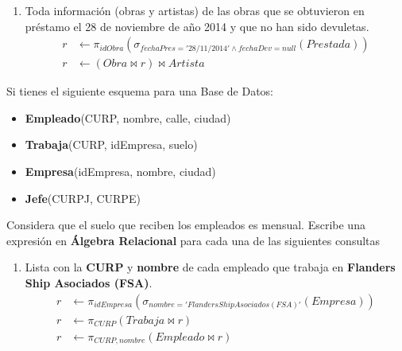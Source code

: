 \documentclass{article}
\begin{document}
\begin{enumerate}
{\begin{enumerate}
{\begin{align*}
                        maxP &\leftarrow \pi_{idObra}(maxP) \bowtie Obra
                    \end{align*}
                }
                \item {
                    Toda información (obras y artistas) de las obras que se
                    obtuvieron en préstamo el 28 de noviembre de año 2014 y que
                    no han sido devuletas.
                    \begin{align*}
                        r &\leftarrow \pi_{idObra}(\sigma_{fechaPres = '28/11/2014' \land
                        fechaDev=null}(Prestada))\\
                        r &\leftarrow (Obra \bowtie r)\bowtie Artista
                    \end{align*}
                }
            \end{enumerate}
            \item {
                Si tienes el siguiente esquema para una Base de Datos:
                \begin{itemize}[label={}]
                    \item \textbf{Empleado}(CURP, nombre, calle, ciudad)
                    \item \textbf{Trabaja}(CURP, idEmpresa, suelo)
                    \item \textbf{Empresa}(idEmpresa, nombre, ciudad)
                    \item \textbf{Jefe}(CURPJ, CURPE)
                \end{itemize}
                Considera que el suelo que reciben los empleados es mensual.
                Escribe una expresión en \textbf{Álgebra Relacional} para cada
                una de las siguientes consultas
                \begin{enumerate}
                    \item {
                        Lista con la \textbf{CURP} y \textbf{nombre} de cada
                        empleado que trabaja en \textbf{Flanders Ship Asociados
                        (FSA)}.
                        \begin{align*}
                            r &\leftarrow \pi_{idEmpresa}(\sigma_{nombre = 
                            'Flanders Ship Asociados(FSA)'}(Empresa)) \\
                            r &\leftarrow \pi_{CURP}(Trabaja \bowtie r) \\
                            r &\leftarrow \pi_{CURP, nombre}(Empleado \bowtie r)

\end{align*}}
\end{enumerate}}}
\end{enumerate}
\end{document}
